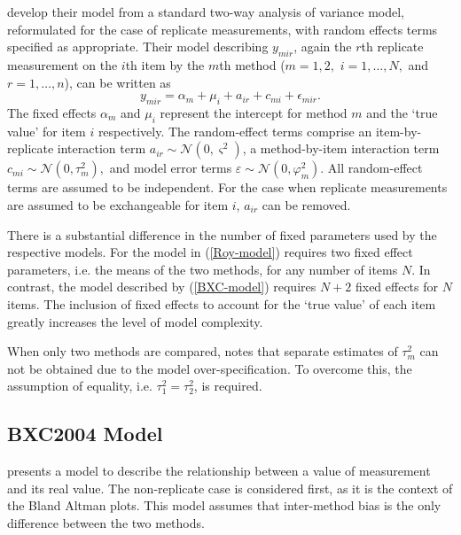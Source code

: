 \documentclass[12pt, a4paper]{report}
\theoremstyle{plain}
\theoremstyle{definition}
\theoremstyle{remark}
\begin{document}
\citet{BXC2008} develop their model from a standard two-way analysis of variance model, reformulated for the case of replicate measurements, with random effects terms specified as appropriate. 
Their model describing $y_{mir} $, again the $r$th replicate measurement on the $i$th item by the $m$th method ($m=1,2,$ $i=1,\ldots,N,$ and $r = 1,\ldots,n$), can be written as
\begin{equation}\label{BXC-model}
y_{mir}  = \alpha_{m} + \mu_{i} + a_{ir} + c_{mi} + \epsilon_{mir}.
\end{equation}
The fixed effects $\alpha_{m}$ and $\mu_{i}$  represent the intercept for method $m$ and the `true value' for item $i$ respectively. The random-effect terms comprise an item-by-replicate interaction term $a_{ir} \sim \mathcal{N}(0,\varsigma^{2})$, a method-by-item interaction term $c_{mi} \sim \mathcal{N}(0,\tau^{2}_{m}),$ and model error terms $\varepsilon \sim \mathcal{N}(0,\varphi^{2}_{m}).$ All random-effect terms are assumed to be independent.
For the case when replicate measurements are assumed to be exchangeable for item $i$, $a_{ir}$ can be removed.


There is a substantial difference in the number of fixed parameters used by the respective models. For the model in (\ref{Roy-model}) requires two fixed effect parameters, i.e. the means of the two methods, for any number of items $N$. In contrast, the model described by (\ref{BXC-model}) requires $N+2$ fixed effects for $N$ items. The inclusion of fixed effects to account for the `true value' of each item greatly increases the level of model complexity.

When only two methods are compared, \citet{BXC2008} notes that separate estimates of $\tau^2_m$ can not be obtained due to the model over-specification. To overcome this, the assumption of equality, i.e. $\tau^2_1 = \tau^2_2$, is required.

\newpage
\subsection{BXC2004 Model}
\citet{BXC2004} presents a model to describe the relationship between a value of measurement and its
real value. The non-replicate case is considered first, as it is the context of the Bland Altman plots. This model assumes that inter-method bias is the only difference between the two methods.
\end{document}
